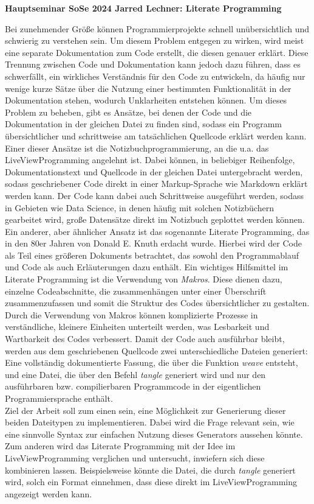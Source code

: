 \documentclass[11pt]{article}
\begin{document}
\begin{center}
{\huge\bfseries Hauptseminar SoSe 2024 Jarred Lechner: \newline Literate Programming \par}
\end{center}
Bei zunehmender Größe können Programmierprojekte schnell unübersichtlich und schwierig zu verstehen sein. Um diesem Problem entgegen zu wirken, wird meist eine separate Dokumentation zum Code erstellt, die diesen genauer erklärt. Diese Trennung zwischen Code und Dokumentation kann jedoch dazu führen, dass es schwerfällt, ein wirkliches Verständnis für den Code zu entwickeln, da häufig nur wenige kurze Sätze über die Nutzung einer bestimmten Funktionalität in der Dokumentation stehen, wodurch Unklarheiten entstehen können. Um dieses Problem zu beheben, gibt es Ansätze, bei denen der Code und die Dokumentation in der gleichen Datei zu finden sind, sodass ein Programm übersichtlicher und schrittweise am tatsächlichen Quellcode erklärt werden kann. Einer dieser Ansätze ist die Notizbuchprogrammierung, an die u.a. das LiveViewProgramming angelehnt ist. Dabei können, in beliebiger Reihenfolge, Dokumentationstext und Quellcode in der gleichen Datei untergebracht werden, sodass geschriebener Code direkt in einer Markup-Sprache wie Markdown erklärt werden kann. Der Code kann dabei auch Schrittweise ausgeführt werden, sodass in Gebieten wie Data Science, in denen häufig mit solchen Notizbüchern gearbeitet wird, große Datensätze direkt im Notizbuch geplottet werden können.\\ Ein anderer, aber ähnlicher Ansatz ist das sogenannte Literate Programming, das in den 80er Jahren von Donald E. Knuth erdacht wurde. Hierbei wird der Code als Teil eines größeren Dokuments betrachtet, das sowohl den Programmablauf und Code als auch Erläuterungen dazu enthält. Ein wichtiges Hilfsmittel im Literate Programming ist die Verwendung von \textit{Makros}. Diese dienen dazu, einzelne Codeabschnitte, die zusammenhängen unter einer Überschrift zusammenzufassen und somit die Struktur des Codes übersichtlicher zu gestalten. Durch die Verwendung von Makros können komplizierte Prozesse in verständliche, kleinere Einheiten unterteilt werden, was Lesbarkeit und Wartbarkeit des Codes verbessert. Damit der Code auch ausführbar bleibt, werden aus dem geschriebenen Quellcode zwei unterschiedliche Dateien generiert: Eine vollständig dokumentierte Fassung, die über die Funktion \textit{weave} entsteht, und eine Datei, die über den Befehl \textit{tangle} generiert wird und nur den ausführbaren bzw. compilierbaren Programmcode in der eigentlichen Programmiersprache enthält.\\

Ziel der Arbeit soll zum einen sein, eine Möglichkeit zur Generierung dieser beiden Dateitypen zu implementieren. Dabei wird die Frage relevant sein, wie eine sinnvolle Syntax zur einfachen Nutzung dieses Generators aussehen könnte. Zum anderen wird das Literate Programming mit der Idee im LiveViewProgramming verglichen und untersucht, inwiefern sich diese kombinieren lassen. Beispielsweise könnte die Datei, die durch \textit{tangle} generiert wird, solch ein Format einnehmen, dass diese direkt im LiveViewProgramming angezeigt werden kann.
\end{document}
